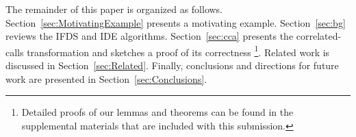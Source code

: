 The remainder of this paper is organized as follows.
%
Section~\ref{sec:MotivatingExample} presents a motivating example.
%
Section~\ref{sec:bg} reviews the IFDS and IDE algorithms.
%
Section~\ref{sec:cca} presents the correlated-calls transformation
and sketches a proof of its correctness%
\footnote{
  Detailed proofs of our lemmas and theorems can be found in
  the supplemental materials that are included with this submission.
}.
%
Related work is discussed in Section~\ref{sec:Related}.
%
Finally, conclusions and directions for future work are presented in Section~\ref{sec:Conclusions}.

 
 
